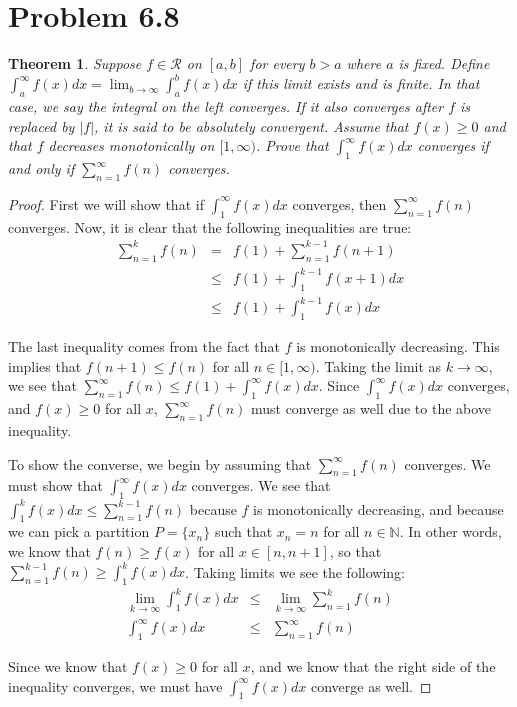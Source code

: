 \documentclass[psamsfonts]{amsart}
\newtheorem{thm}{Theorem}[section]
\theoremstyle{definition}
\theoremstyle{remark}
\numberwithin{equation}{section}
\begin{document}
\section{Problem 6.8}

\begin{thm}
Suppose $f \in \mathscr{R}$ on $[a,b]$ for every $b>a$ where $a$ is fixed. Define $\int_a^\infty f(x)dx = \lim_{b \to \infty} \int_a^b f(x) dx$ if this limit exists and is finite. In that case, we say the integral on the left converges. If it also converges after $f$ is replaced by $|f|$, it is said to be absolutely convergent. Assume that $f(x) \geq 0$ and that $f$ decreases monotonically on $[1,\infty)$. Prove that $\int_1^\infty f(x) dx$ converges if and only if $\sum_{n=1}^\infty f(n)$ converges.
\end{thm}

\begin{proof}
First we will show that if $\int_1^\infty f(x) dx$ converges, then $\sum_{n=1}^\infty f(n)$ converges. Now, it is clear that the following inequalities are true:
\begin{eqnarray}
\sum_{n=1}^k f(n) &=& f(1) + \sum_{n=1}^{k-1} f(n+1) \\
&\leq& f(1) + \int_1^{k-1} f(x+1) dx \\
&\leq& f(1) + \int_1^{k-1} f(x) dx
\end{eqnarray}

The last inequality comes from the fact that $f$ is monotonically decreasing. This implies that $f(n+1) \leq f(n)$ for all $n \in [1, \infty)$. Taking the limit as $k \to \infty$, we see that $\sum_{n=1}^\infty f(n) \leq f(1) + \int_1^\infty f(x) dx$. Since $\int_1^\infty f(x) dx$ converges, and $f(x) \geq 0$ for all $x$, $\sum_{n=1}^\infty f(n)$ must converge as well due to the above inequality. 

To show the converse, we begin by assuming that $\sum_{n=1}^\infty f(n)$ converges. We must show that $\int_1^\infty f(x) dx$ converges. We see that $\int_1^k f(x) dx \leq \sum_{n=1}^{k-1} f(n)$ because $f$ is monotonically decreasing, and because we can pick a partition $P = \{ x_n \}$ such that $x_n = n$ for all $n \in \mathbb{N}$. In other words, we know that $f(n) \geq f(x)$ for all $x \in [n,n+1]$, so that $\sum_{n=1}^{k-1} f(n) \geq \int_{1}^k f(x) dx$. Taking limits we see the following:
\begin{eqnarray}
\lim_{k \to \infty} \int_{1}^k f(x) dx &\leq& \lim_{k \to \infty} \sum_{n = 1}^k f(n) \\
\int_1^\infty f(x) dx &\leq& \sum_{n=1}^\infty f(n)
\end{eqnarray}

Since we know that $f(x) \geq 0$ for all $x$, and we know that the right side of the inequality converges, we must have $\int_1^\infty f(x) dx$ converge as well.
\end{proof}
\end{document}
